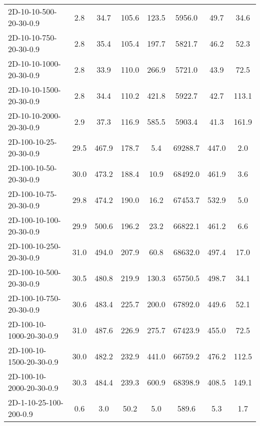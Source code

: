 \documentclass{article}
\begin{document}
\begin{table}[h]
\begin{center}
\begin{tabular}{|l||c|c|c|c|c|c|c|}
            2D-10-10-500-20-30-0.9         & 2.8  & 34.7      & 105.6      & 123.5       & 5956.0   & 49.7      & 34.6       \\
            2D-10-10-750-20-30-0.9         & 2.8  & 35.4      & 105.4      & 197.7       & 5821.7   & 46.2      & 52.3       \\
            2D-10-10-1000-20-30-0.9        & 2.8  & 33.9      & 110.0      & 266.9       & 5721.0   & 43.9      & 72.5       \\
            2D-10-10-1500-20-30-0.9        & 2.8  & 34.4      & 110.2      & 421.8       & 5922.7   & 42.7      & 113.1      \\
            2D-10-10-2000-20-30-0.9        & 2.9  & 37.3      & 116.9      & 585.5       & 5903.4   & 41.3      & 161.9      \\
            \hline
            2D-100-10-25-20-30-0.9         & 29.5 & 467.9     & 178.7      & 5.4         & 69288.7  & 447.0     & 2.0        \\
            2D-100-10-50-20-30-0.9         & 30.0 & 473.2     & 188.4      & 10.9        & 68492.0  & 461.9     & 3.6        \\
            2D-100-10-75-20-30-0.9         & 29.8 & 474.2     & 190.0      & 16.2        & 67453.7  & 532.9     & 5.0        \\
            2D-100-10-100-20-30-0.9        & 29.9 & 500.6     & 196.2      & 23.2        & 66822.1  & 461.2     & 6.6        \\
            2D-100-10-250-20-30-0.9        & 31.0 & 494.0     & 207.9      & 60.8        & 68632.0  & 497.4     & 17.0       \\
            2D-100-10-500-20-30-0.9        & 30.5 & 480.8     & 219.9      & 130.3       & 65750.5  & 498.7     & 34.1       \\
            2D-100-10-750-20-30-0.9        & 30.6 & 483.4     & 225.7      & 200.0       & 67892.0  & 449.6     & 52.1       \\
            2D-100-10-1000-20-30-0.9       & 31.0 & 487.6     & 226.9      & 275.7       & 67423.9  & 455.0     & 72.5       \\
            2D-100-10-1500-20-30-0.9       & 30.0 & 482.2     & 232.9      & 441.0       & 66759.2  & 476.2     & 112.5      \\
            2D-100-10-2000-20-30-0.9       & 30.3 & 484.4     & 239.3      & 600.9       & 68398.9  & 408.5     & 149.1      \\
            \hline
            2D-1-10-25-100-200-0.9         & 0.6  & 3.0       & 50.2       & 5.0         & 589.6    & 5.3       & 1.7        \\

\end{tabular}
\end{center}
\end{table}
\end{document}
